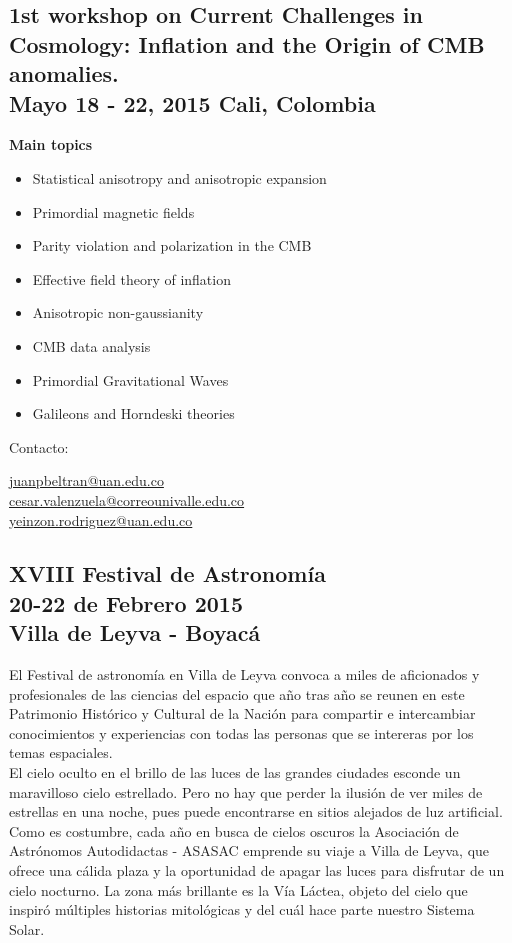 \documentclass{book}
\begin{document}
\subsection{1st workshop on Current Challenges in Cosmology: Inflation and the Origin of CMB anomalies.\\ Mayo 18 - 22, 2015 Cali, Colombia}

\textbf{Main topics}
\begin{itemize}
\item Statistical anisotropy and anisotropic expansion
\item Primordial magnetic fields
\item Parity violation and polarization in the CMB
\item Effective field theory of inflation
\item Anisotropic non-gaussianity
\item CMB data analysis
\item Primordial Gravitational  Waves
\item Galileons and Horndeski theories
\end{itemize}

Contacto:\\
\begin{flushright}
\url{juanpbeltran@uan.edu.co}\\
\url{cesar.valenzuela@correounivalle.edu.co}\\
\url{yeinzon.rodriguez@uan.edu.co}
\end{flushright}
\newpage
\subsection{XVIII Festival de Astronomía\\20-22 de Febrero 2015\\Villa de Leyva - Boyacá}

El Festival de astronomía en Villa de Leyva convoca a miles de aficionados y profesionales de las ciencias del espacio que año tras año se reunen en este Patrimonio Histórico y Cultural de la Nación para compartir e intercambiar conocimientos y experiencias con todas las personas que se intereras por los temas espaciales.\\

\noindent El cielo oculto en el brillo de las luces de las grandes ciudades esconde un maravilloso cielo estrellado. Pero no hay que perder la ilusión de ver miles de estrellas en una noche, pues puede encontrarse en sitios alejados de luz artificial. Como es costumbre, cada año en busca de cielos oscuros la Asociación de Astrónomos Autodidactas - ASASAC emprende su viaje a Villa de Leyva, que ofrece una cálida plaza y la oportunidad de apagar las luces para disfrutar de un cielo nocturno. La zona más brillante es la Vía Láctea, objeto del cielo que inspiró múltiples historias mitológicas y del cuál hace parte nuestro Sistema Solar.\\
\end{document}
